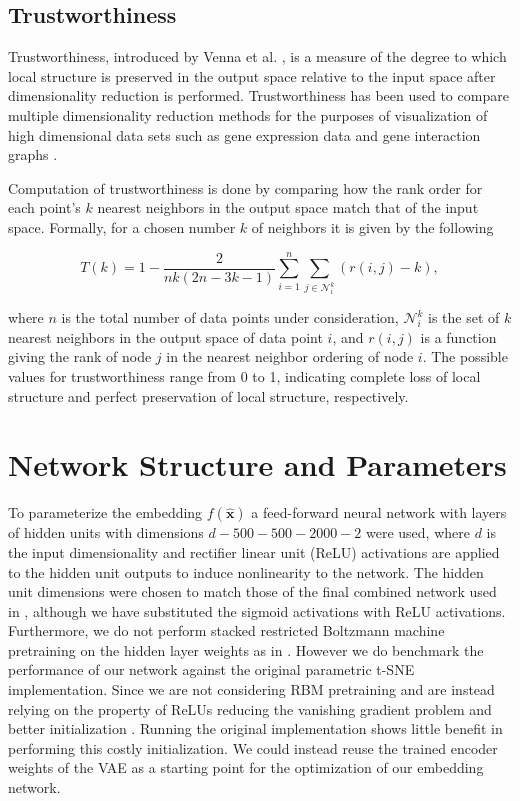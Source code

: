 \subsection{Trustworthiness}

Trustworthiness, introduced by Venna et al. \cite{trustworthiness}, is a measure of the degree to which local structure is preserved in the output space relative to the input space after dimensionality reduction is performed. Trustworthiness has been used to compare multiple dimensionality reduction methods for the purposes of visualization of high dimensional data sets such as gene expression data \cite{trustworthiness_gene_expression} and gene interaction graphs \cite{trustworthiness_gene_interaction}.

Computation of trustworthiness is done by comparing how the rank order for each point's $k$ nearest neighbors in the output space match that of the input space. Formally, for a chosen number $k$ of neighbors it is given by the following 

$$T(k) = 1 - \frac{2}{nk (2n - 3k - 1)} \sum^{n}_{i=1} \sum_{j \in \mathcal{N}_{i}^{k}} (r(i, j) - k),$$

where $n$ is the total number of data points under consideration, $\mathcal{N}_{i}^{k}$ is the set of $k$ nearest neighbors in the output space of data point $i$, and $r(i, j)$ is a function giving the rank of node $j$ in the nearest neighbor ordering of node $i$. The possible values for trustworthiness range from 0 to 1, indicating complete loss of local structure and perfect preservation of local structure, respectively.

\section{Network Structure and Parameters}

To parameterize the embedding $f(\mathbf{\hat{x}})$ a feed-forward neural network with layers of hidden units with dimensions $d - 500 - 500 - 2000 - 2$ were used, where $d$ is the input dimensionality and rectifier linear unit (ReLU) activations are applied to the hidden unit outputs to induce nonlinearity to the network. The hidden unit dimensions were chosen to match those of the final combined network used in \citep{parametric_tsne}, although we have substituted the sigmoid activations with ReLU activations. Furthermore, we do not perform stacked restricted Boltzmann machine pretraining on the hidden layer weights as in \citep{parametric_tsne}. However we do benchmark the performance of our network against the original parametric t-SNE implementation. Since we are not considering RBM pretraining and are instead relying on the property of ReLUs reducing the vanishing gradient problem \citep{relu} and better initialization \citep{xavier_initializer}. Running the original implementation shows little benefit in performing this costly initialization. We could instead reuse the trained encoder weights of the VAE as a starting point for the optimization of our embedding network.


